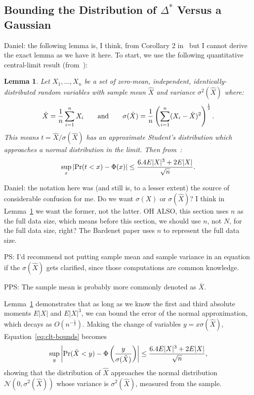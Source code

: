 \documentclass{article}
\newtheorem{lemma}{Lemma}
\begin{document}
\subsection{Bounding the Distribution of $\Delta^*$ Versus a Gaussian}\label{ssec:delta_star_distribution}

{\color{blue} Daniel: the following lemma is, I think, from Corollary 2
in~\cite{explicit-clt05} but I cannot derive the exact lemma as we have it
here.} To start, we use the following quantitative central-limit result
(from~\cite{explicit-clt05}):
  
\begin{lemma}\label{lem:quant_clt}
Let $X_1,\ldots,X_n$ be a set of zero-mean, independent, identically-distributed
random variables with sample mean $\hat{X}$ and variance $\sigma^2(\hat{X})$
where:
\begin{equation}
    \hat{X} = \frac{1}{n}\sum_{i=1}^nX_i \qquad {\rm and} \qquad \sigma(\hat{X}) = \frac{1}{n}\left(\sum_{i=1}^n(X_i-\hat{X})^2\right)^{\frac{1}{2}}.
\end{equation}
This means $t=\hat{X}/\sigma(\hat{X})$ has an approximate Student's distribution
which approaches a normal distribution in the limit. Then
from~\cite{explicit-clt05}:
\begin{equation}\label{eq:clt-bounds}
    \sup_x|{\rm Pr}(t<x) - \Phi(x)| \leq \frac{6.4E|X|^3+2E|X|}{\sqrt{n}}.
\end{equation}
\end{lemma}

{\color{blue} Daniel: the notation here was (and still is, to a lesser extent)
the source of considerable confusion for me. Do we want $\sigma(X)$ or
$\sigma(\hat{X})$? I think in Lemma~\ref{lem:quant_clt} we want the former, not
the latter. OH ALSO, this section uses $n$ as the full data size, which means
before this section, we should use $n$, not $N$, for the full data size, right?
The Bardenet paper uses $n$ to represent the full data size.

PS: I'd recommend not putting sample mean and sample variance in an equation if
the $\sigma(\hat{X})$ gets clarified, since those computations are common
knowledge.

PPS: The sample mean is probably more commonly denoted as $\bar{X}$.}

Lemma~\ref{lem:quant_clt} demonstrates that as long as we know the first and
third absolute moments $E|X|$ and $E|X|^3$, we can bound the error of the normal
approximation, which decays as $O(n^{-\frac{1}{2}})$. Making the change of
variables $y = x \sigma(\hat{X})$, Equation~\ref{eq:clt-bounds} becomes
\begin{equation}\label{eq:clt-bounds2}
   \sup_y\left|{\rm Pr}(\hat{X}< y) - \Phi\left(\frac{y}{\sigma(\hat{X})}\right)\right| \leq \frac{6.4E|X|^3+2E|X|}{\sqrt{n}},
\end{equation}
showing that the distribution of $\hat{X}$ approaches the normal distribution
$\mathcal{N}(0,\sigma^2(\hat{X}))$ whose variance is $\sigma^2(\hat{X})$,
measured from the sample.
\end{document}

